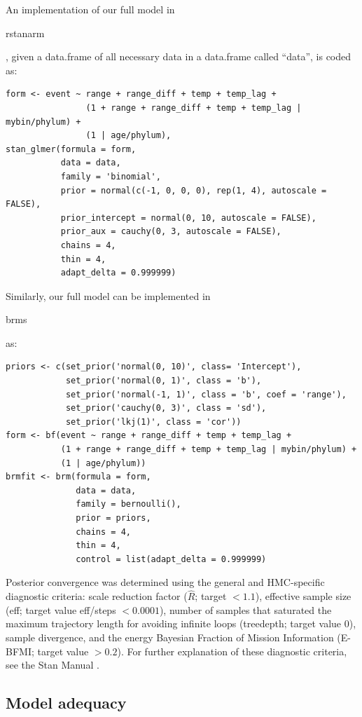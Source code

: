 \documentclass[12pt,letterpaper]{article}
\begin{document}
An implementation of our full model in \begin{texttt}rstanarm\end{texttt}, given a data.frame of all necessary data in a data.frame called ``data'', is coded as:
\begin{verbatim}
form <- event ~ range + range_diff + temp + temp_lag + 
                (1 + range + range_diff + temp + temp_lag | mybin/phylum) + 
                (1 | age/phylum), 
stan_glmer(formula = form,
           data = data, 
           family = 'binomial',
           prior = normal(c(-1, 0, 0, 0), rep(1, 4), autoscale = FALSE), 
           prior_intercept = normal(0, 10, autoscale = FALSE), 
           prior_aux = cauchy(0, 3, autoscale = FALSE), 
           chains = 4,
           thin = 4,
           adapt_delta = 0.999999)
\end{verbatim}

Similarly, our full model can be implemented in \begin{texttt}brms\end{texttt} \citep{brms2017,brms2018} as:
\begin{verbatim}
priors <- c(set_prior('normal(0, 10)', class= 'Intercept'),
            set_prior('normal(0, 1)', class = 'b'),
            set_prior('normal(-1, 1)', class = 'b', coef = 'range'),
            set_prior('cauchy(0, 3)', class = 'sd'),
            set_prior('lkj(1)', class = 'cor'))
form <- bf(event ~ range + range_diff + temp + temp_lag +
           (1 + range + range_diff + temp + temp_lag | mybin/phylum) +
           (1 | age/phylum))
brmfit <- brm(formula = form,
              data = data, 
              family = bernoulli(), 
              prior = priors,
              chains = 4, 
              thin = 4,
              control = list(adapt_delta = 0.999999)
\end{verbatim}

Posterior convergence was determined using the general and HMC-specific diagnostic criteria: scale reduction factor (\(\hat{R}\); target \(<1.1\)), effective sample size (eff; target value eff/steps \(<0.0001\)), number of samples that saturated the maximum trajectory length for avoiding infinite loops (treedepth; target value 0), sample divergence, and the energy Bayesian Fraction of Mission Information (E-BFMI; target value \(>0.2\)). For further explanation of these diagnostic criteria, see the Stan Manual \citep{StanManual}.


\subsection{Model adequacy}
\end{document}
